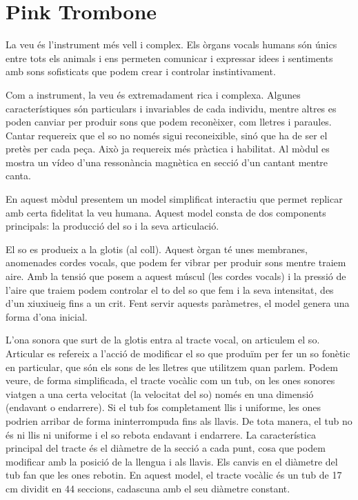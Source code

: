 \section{Pink Trombone}
La veu és l'instrument més vell i complex. Els òrgans vocals humans són únics entre tots els animals i ens permeten comunicar i expressar idees i sentiments amb sons sofisticats que podem crear i controlar instintivament.

Com a instrument, la veu és extremadament rica i complexa. Algunes característiques són particulars i invariables de cada individu, mentre altres es poden canviar per produir sons que podem reconèixer, com lletres i paraules. Cantar requereix que el so no només sigui reconeixible, sinó que ha de ser el pretès per cada peça. Això ja requereix més pràctica i habilitat. Al mòdul es mostra un vídeo d'una ressonància magnètica en secció d'un cantant mentre canta.

En aquest mòdul presentem un model simplificat interactiu que permet replicar amb certa fidelitat la veu humana. Aquest model consta de dos components principals: la producció del so i la seva articulació.

El so es produeix a la glotis (al coll). Aquest òrgan té unes membranes, anomenades cordes vocals, que podem fer vibrar per produir sons mentre traiem aire. Amb la tensió que posem a aquest múscul (les cordes vocals) i la pressió de l'aire que traiem podem controlar el to del so que fem i la seva intensitat, des d'un xiuxiueig fins a un crit. Fent servir aquests paràmetres, el model genera una forma d'ona inicial.

L'ona sonora que surt de la glotis entra al tracte vocal, on articulem el so. Articular es refereix a l'acció de modificar el so que produïm per fer un so fonètic en particular, que són els sons de les lletres que utilitzem quan parlem. Podem veure, de forma simplificada, el tracte vocàlic com un tub, on les ones sonores viatgen a una certa velocitat (la velocitat del so) només en una dimensió (endavant o endarrere). Si el tub fos completament llis i uniforme, les ones podrien arribar de forma ininterrompuda fins als llavis. De tota manera, el tub no és ni llis ni uniforme i el so rebota endavant i endarrere. La característica principal del tracte és el diàmetre de la secció a cada punt, cosa que podem modificar amb la posició de la llengua i als llavis. Els canvis en el diàmetre del tub fan que les ones rebotin. En aquest model, el tracte vocàlic és un tub de 17 cm dividit en 44 seccions, cadascuna amb el seu diàmetre constant.

